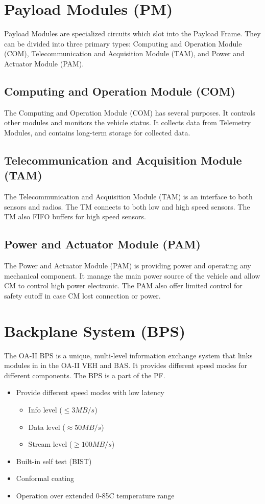 \documentclass[12pt,article]{memoir}
\begin{document}
\section{Payload Modules (PM)}
Payload Modules are specialized circuits which slot into the Payload Frame. They can be divided into three primary types: Computing and Operation Module (COM), Telecommunication and Acquisition Module (TAM), and Power and Actuator Module (PAM).
\subsection{Computing and Operation Module (COM)}
The Computing and Operation Module (COM) has several purposes. It controls other modules and monitors the vehicle status. It collects data from Telemetry Modules, and contains long-term storage for collected data. 
\subsection{Telecommunication and Acquisition Module (TAM)}
The Telecommunication and Acquisition Module (TAM) is an interface to both sensors and radios. The TM connects to both low and high speed sensors. The TM also FIFO buffers for high speed sensors.
\subsection{Power and Actuator Module (PAM)}%
The Power and Actuator Module (PAM) is providing power and operating any mechanical component. It manage the main power source of the vehicle and allow CM to control high power electronic. The PAM also offer limited control for safety cutoff in case CM lost connection or power.


\section{Backplane System (BPS)}
The OA-II BPS is a unique, multi-level information exchange system that links modules in in the OA-II VEH and BAS. It provides different speed modes for different components. The BPS is a part of the PF.

\begin{itemize}
	\item Provide different speed modes with low latency
	\begin{itemize}
		\item Info level ($\leq 3MB/s$)
		\item Data level ($\approx 50MB/s$)
		\item Stream level ($\geq 100MB/s$)
	\end{itemize}
	\item Built-in self test (BIST)
	\item Conformal coating
	\item Operation over extended 0-85\degree C temperature range
\end{itemize}
\end{document}
